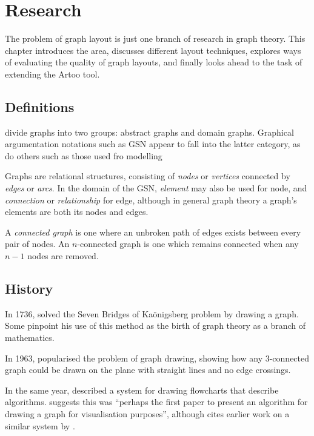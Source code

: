 \chapter{Research}

The problem of graph layout is just one branch of research in graph theory.
This chapter introduces the area, discusses different layout techniques, explores ways of evaluating the quality of graph layouts, and finally looks ahead to the task of extending the Artoo tool.


\section{Definitions}

\citet{huang2007effects} divide graphs into two groups: abstract graphs and domain graphs.
Graphical argumentation notations such as GSN appear to fall into the latter category, as do others such as those used fro modelling 

Graphs are relational structures, consisting of \emph{nodes} or \emph{vertices} connected by \emph{edges} or \emph{arcs}. In the domain of the GSN, \emph{element} may also be used for node, and \emph{connection} or \emph{relationship} for edge, although in general graph theory a graph's elements are both its nodes and edges.

A \emph{connected graph} is one where an unbroken path of edges exists between every pair of nodes. An $n$-connected graph is one which remains connected when any $n-1$ nodes are removed. 

\section{History}

In 1736, \citet{euler} solved the Seven Bridges of Ka\"{o}nigsberg problem by drawing a graph.
Some \cite{alexanderson2006cover} pinpoint his use of this method as the birth of graph theory as a branch of mathematics.

In 1963, \citet{tutte} popularised the problem of graph drawing, showing how any 3-connected
graph could be drawn on the plane with straight lines and no edge crossings.

In the same year, \citet{Knuth63} described a system for drawing flowcharts that describe algorithms. \citet{battista} suggests this was ``perhaps the first paper to present an algorithm for drawing a graph for visualisation purposes'', although \citeauthor{Knuth63} cites earlier work on a similar system by \citet{haibt1959}.



